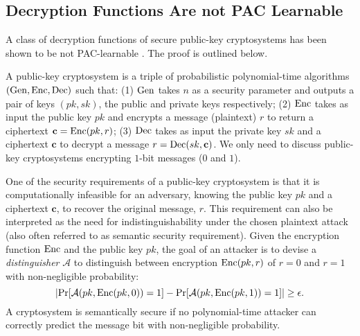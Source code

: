 \subsection{Decryption Functions Are not PAC Learnable}

A class of decryption functions of secure public-key cryptosystems has been shown to be not PAC-learnable \cite{kearns1994cryptographic,klivans2006cryptographic}. The proof is outlined below.

A public-key cryptosystem is a triple of probabilistic polynomial-time algorithms $(\Gen,\Enc,\Dec)$ such that:
(1) $\Gen$ takes $n$ as a security parameter and outputs a pair of keys $(pk,sk)$, the public and private keys respectively;
(2) $\Enc$ takes as input the public key $pk$ and encrypts a message (plaintext) $r$ to return a ciphertext $\mathbf{c} = \Enc(pk,r)$;
(3) $\Dec$ takes as input the private key $sk$ and a ciphertext $\mathbf{c}$ to decrypt a message $r = \Dec(sk,\mathbf{c})$.
We only need to discuss public-key cryptosystems encrypting $1$-bit messages ($0$ and $1$).

One of the security requirements of a public-key cryptosystem is that it is computationally infeasible for an adversary, knowing the public key $pk$ and a ciphertext $\mathbf{c}$, to recover the original message, $r$. 
This requirement can also be interpreted as the need for indistinguishability under the chosen plaintext attack (also often referred to as semantic security requirement). %
Given the encryption function $\Enc$ and the public key $pk$, the goal of an attacker is to devise a \emph{distinguisher} $\mathcal{A}$ to distinguish between encryption $\Enc(pk,r)$ of $r=0$ and $r=1$ with non-negligible probability:
\begin{equation*}
\abs{\Pr[\mathcal{A}(pk,\Enc(pk,0))=1] - \Pr[\mathcal{A}(pk,\Enc(pk,1))=1]}\geq \epsilon.
\end{equation*}
A cryptosystem is semantically secure if no polynomial-time attacker can correctly predict the message bit with non-negligible probability.


